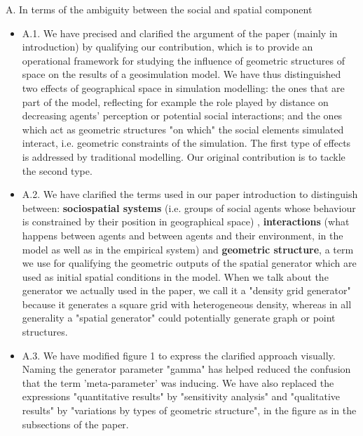 \documentclass[11pt,a4paper,sans]{moderncv}        %
\begin{document}
 \medskip
A. In terms of the ambiguity between the social and spatial component 
\begin{itemize}
\item A.1. We have precised and clarified the argument of the paper (mainly in introduction) by qualifying our contribution, which is to provide an operational framework for studying the influence of geometric structures of space on the results of a geosimulation model. We have thus distinguished two effects of geographical space in simulation modelling: the ones that are part of the model, reflecting for example the role played by distance on decreasing agents' perception or potential social interactions; and the ones which act as geometric structures "on which" the social elements simulated interact, i.e. geometric constraints of the simulation. The first type of effects is addressed by traditional modelling. Our original contribution is to tackle the second type. %
 
\item A.2. We have clarified the terms used in our paper introduction to distinguish between: \textbf{sociospatial systems} (i.e. groups of social agents whose behaviour is constrained by their position in geographical space)%
, \textbf{interactions} (what happens between agents and between agents and their environment, in the model as well as in the empirical system) and \textbf{geometric structure}, a term we use for qualifying the geometric outputs of the spatial generator which are used as initial spatial conditions in the model. When we talk about the generator we actually used in the paper, we call it a "density grid generator" because it generates a square grid with heterogeneous density, whereas in all generality a "spatial generator" could potentially generate graph or point structures. %

 \item A.3. We have modified figure 1 to express the clarified approach visually. Naming the generator parameter "gamma" has helped reduced the confusion that the term 'meta-parameter' was inducing. We have also replaced the expressions "quantitative results" by "sensitivity analysis" and "qualitative results" by "variations by types of geometric structure", in the figure as in the subsections of the paper. %
\end{itemize}
\end{document}
